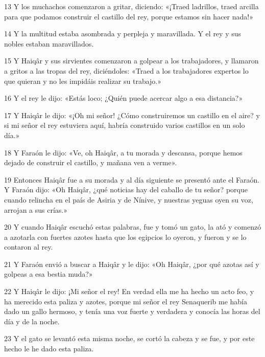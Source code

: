 \par 13 Y los muchachos comenzaron a gritar, diciendo: «¡Traed ladrillos, traed arcilla para que podamos construir el castillo del rey, porque estamos sin hacer nada!»

\par 14 Y la multitud estaba asombrada y perpleja y maravillada. Y el rey y sus nobles estaban maravillados.

\par 15 Y Haiqâr y sus sirvientes comenzaron a golpear a los trabajadores, y llamaron a gritos a las tropas del rey, diciéndoles: «Traed a los trabajadores expertos lo que quieran y no les impidáis realizar su trabajo.»

\par 16 Y el rey le dijo: «Estás loco; ¿Quién puede acercar algo a esa distancia?»

\par 17 Y Haiqâr le dijo: «¡Oh mi señor! ¿Cómo construiremos un castillo en el aire? y si mi señor el rey estuviera aquí, habría construido varios castillos en un solo día.»

\par 18 Y Faraón le dijo: «Ve, oh Haiqâr, a tu morada y descansa, porque hemos dejado de construir el castillo, y mañana ven a verme».

\par 19 Entonces Haiqâr fue a su morada y al día siguiente se presentó ante el Faraón. Y Faraón dijo: «Oh Haiqâr, ¿qué noticias hay del caballo de tu señor? porque cuando relincha en el país de Asiria y de Nínive, y nuestras yeguas oyen su voz, arrojan a sus crías.»

\par 20 Y cuando Haiqâr escuchó estas palabras, fue y tomó un gato, la ató y comenzó a azotarla con fuertes azotes hasta que los egipcios lo oyeron, y fueron y se lo contaron al rey.

\par 21 Y Faraón envió a buscar a Haiqâr y le dijo: «Oh Haiqâr, ¿por qué azotas así y golpeas a esa bestia muda?»

\par 22 Y Haiqâr le dijo: ¡Mi señor el rey! En verdad ella me ha hecho un acto feo, y ha merecido esta paliza y azotes, porque mi señor el rey Senaquerib me había dado un gallo hermoso, y tenía una voz fuerte y verdadera y conocía las horas del día y de la noche.

\par 23 Y el gato se levantó esta misma noche, se cortó la cabeza y se fue, y por este hecho le he dado esta paliza.

